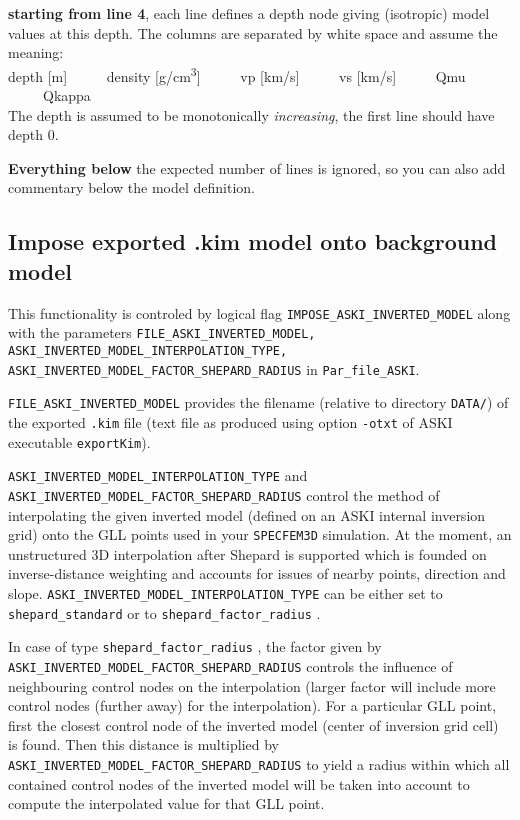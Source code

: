 \documentclass[12pt,a4paper]{article}
\newcommand{\lcode}[1]{\nolinkurl{#1}}
\newcommand{\lcodetitle}[1]{ {\ttfamily #1} }
\newcommand{\ASKI}{ {\ttfamily ASKI} }
\begin{document}
{\bf starting from line 4}, each line defines a depth node giving (isotropic) model values at this depth.
The columns are separated by white space and assume the meaning:\\
depth [m] \ \ \ \ \ density [g/cm\textsuperscript{3}] \ \ \ \ \ vp [km/s] \ \ \ \ \ vs [km/s] \ \ \ \ \ Qmu \ \ \ \ \ Qkappa\\
The depth is assumed to be monotonically \emph{increasing}, the first line should have depth 0. 

{\bf Everything below} the expected number of lines is ignored, so you can also add commentary below the
model definition.

\subsection{Impose exported \lcodetitle{.kim} model onto background model} \label{import_model:ssec_kim_export}
This functionality is controled by logical flag \lcode{IMPOSE_ASKI_INVERTED_MODEL} along with
the parameters \lcode{FILE_ASKI_INVERTED_MODEL, ASKI_INVERTED_MODEL_INTERPOLATION_TYPE, 
ASKI_INVERTED_MODEL_FACTOR_SHEPARD_RADIUS} in \lcode{Par_file_ASKI}.

\lcode{FILE_ASKI_INVERTED_MODEL} provides the filename (relative to directory \lcode{DATA/}) of the exported 
\lcode{.kim} file (text file as produced using option \lcode{-otxt} of \ASKI executable \lcode{exportKim}).

\lcode{ASKI_INVERTED_MODEL_INTERPOLATION_TYPE} and \lcode{ASKI_INVERTED_MODEL_FACTOR_SHEPARD_RADIUS}
control the method of interpolating the given inverted model (defined on an \ASKI internal inversion grid) 
onto the GLL points used in your \lcode{SPECFEM3D} simulation. At the moment, an unstructured 3D 
interpolation after Shepard \cite{Shepard68} is supported  which is founded on inverse-distance weighting 
and accounts for issues of nearby points, direction and slope. 
\lcode{ASKI_INVERTED_MODEL_INTERPOLATION_TYPE}
can be either set to \lcode{shepard_standard} or to \lcode{shepard_factor_radius} .

In case of type \lcode{shepard_factor_radius} , the factor given by \lcode{ASKI_INVERTED_MODEL_FACTOR_SHEPARD_RADIUS}
controls the influence of neighbouring control nodes on the interpolation (larger factor will include more 
control nodes (further away) for the interpolation). For a particular GLL point, first the closest control node of the inverted model
(center of inversion grid cell) is found. Then this distance is multiplied by 
\lcode{ASKI_INVERTED_MODEL_FACTOR_SHEPARD_RADIUS} to yield a radius within which all contained control nodes
of the inverted model will be taken into account to compute the interpolated value for that GLL point.
\end{document}
